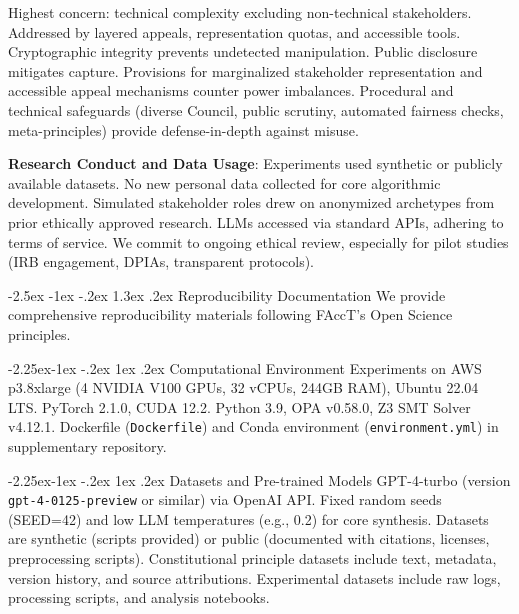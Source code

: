 \documentclass[manuscript,screen,review,anonymous,9pt]{acmart}
\makeatletter
\renewcommand\section{\@startsection{section}{1}{\z@}%
  {-2.5ex \@plus -1ex \@minus -.2ex}%
  {1.3ex \@plus.2ex}%
  {\normalfont\Large\bfseries}}
\renewcommand\subsection{\@startsection{subsection}{2}{\z@}%
  {-2.25ex\@plus -1ex \@minus -.2ex}%
  {1ex \@plus .2ex}%
  {\normalfont\large\bfseries}}
\makeatother
\begin{document}
Highest concern: technical complexity excluding non-technical stakeholders. Addressed by layered appeals, representation quotas, and accessible tools. Cryptographic integrity prevents undetected manipulation. Public disclosure mitigates capture. Provisions for marginalized stakeholder representation and accessible appeal mechanisms counter power imbalances. Procedural and technical safeguards (diverse Council, public scrutiny, automated fairness checks, meta-principles) provide defense-in-depth against misuse.

\textbf{Research Conduct and Data Usage}:
Experiments used synthetic or publicly available datasets. No new personal data collected for core algorithmic development. Simulated stakeholder roles drew on anonymized archetypes from prior ethically approved research. LLMs accessed via standard APIs, adhering to terms of service. We commit to ongoing ethical review, especially for pilot studies (IRB engagement, DPIAs, transparent protocols).

\section{Reproducibility Documentation}
\label{app:reproducibility}
We provide comprehensive reproducibility materials following FAccT's Open Science principles.

\subsection{Computational Environment}
Experiments on AWS p3.8xlarge (4 NVIDIA V100 GPUs, 32 vCPUs, 244GB RAM), Ubuntu 22.04 LTS. PyTorch 2.1.0, CUDA 12.2. Python 3.9, OPA v0.58.0, Z3 SMT Solver v4.12.1. Dockerfile (\texttt{Dockerfile}) and Conda environment (\texttt{environment.yml}) in supplementary repository.

\subsection{Datasets and Pre-trained Models}
GPT-4-turbo (version \texttt{gpt-4-0125-preview} or similar) via OpenAI API. Fixed random seeds (SEED=42) and low LLM temperatures (e.g., 0.2) for core synthesis. Datasets are synthetic (scripts provided) or public (documented with citations, licenses, preprocessing scripts). Constitutional principle datasets include text, metadata, version history, and source attributions. Experimental datasets include raw logs, processing scripts, and analysis notebooks.
\end{document}
